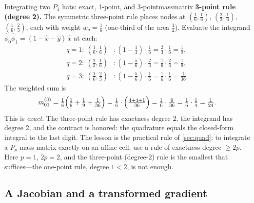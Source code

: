 \begin{workedexample}{Integrating two $P_1$ hats: exact, 1-point, and 3-point}{massmatrix}
\smallskip\noindent\textbf{3-point rule (degree 2).} The symmetric three-point rule
places nodes at $(\tfrac16,\tfrac16)$, $(\tfrac23,\tfrac16)$, $(\tfrac16,\tfrac23)$,
each with weight $w_q=\tfrac16$ (one-third of the area $\tfrac12$). Evaluate the
integrand $\hat\phi_0\hat\phi_1=(1-\hat x-\hat y)\,\hat x$ at each:
\begin{align*}
  q=1:\ (\tfrac16,\tfrac16) &: (1-\tfrac13)\cdot\tfrac16 = \tfrac23\cdot\tfrac16 = \tfrac{1}{9}, \\
  q=2:\ (\tfrac23,\tfrac16) &: (1-\tfrac56)\cdot\tfrac23 = \tfrac16\cdot\tfrac23 = \tfrac{1}{9}, \\
  q=3:\ (\tfrac16,\tfrac23) &: (1-\tfrac56)\cdot\tfrac16 = \tfrac16\cdot\tfrac16 = \tfrac{1}{36}.
\end{align*}
The weighted sum is
\[
  m_{01}^{(3)} = \tfrac16\Bigl(\tfrac19+\tfrac19+\tfrac1{36}\Bigr)
              = \tfrac16\cdot\Bigl(\tfrac{4+4+1}{36}\Bigr)
              = \tfrac16\cdot\tfrac{9}{36} = \tfrac16\cdot\tfrac14 = \tfrac{1}{24}.
\]
This is \emph{exact}. The three-point rule has exactness degree $2$, the integrand
has degree $2$, and the contract is honored: the quadrature equals the closed-form
integral to the last digit. The lesson is the practical rule of \cref{sec:quad}: to
integrate a $P_p$ mass matrix exactly on an affine cell, use a rule of exactness
degree $\ge 2p$. Here $p=1$, $2p=2$, and the three-point (degree-$2$) rule is the
smallest that suffices---the one-point rule, degree $1<2$, is not enough.
\end{workedexample}

\subsection{A Jacobian and a transformed gradient}

